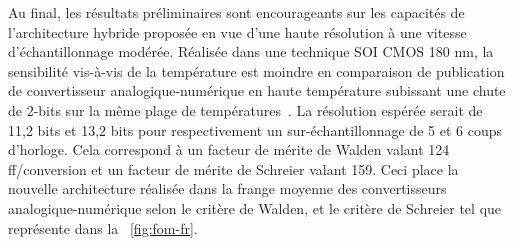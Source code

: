 \begin{mdframed}[linecolor=Prune,linewidth=1]
Au final, les résultats préliminaires sont encourageants sur les capacités de l'architecture hybride proposée en vue d'une haute résolution à une vitesse d'échantillonnage modérée. Réalisée dans une technique SOI CMOS 180 nm, la sensibilité vis-à-vis de la température est moindre en comparaison de publication de convertisseur analogique-numérique en haute température subissant une chute de 2-bits sur la même plage de températures~\cite{Ericson2004}. La résolution espérée serait de 11,2 bits et 13,2 bits pour respectivement un sur-échantillonnage de 5 et 6 coups d'horloge. Cela correspond à un facteur de mérite de Walden valant 124 ff/conversion et un facteur de mérite de Schreier valant 159. Ceci place la nouvelle architecture réalisée dans la frange moyenne des convertisseurs analogique-numérique selon le critère de Walden, et le critère de Schreier tel que représente dans la \figurename~\ref{fig:fom-fr}.


\end{mdframed}
